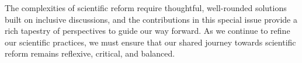 \documentclass[authordate, editorial, noabstract, issue]{jote-new-article}
\begin{document}
The complexities of scientific reform require thoughtful, well-rounded solutions built on inclusive discussions, and the contributions in this special issue provide a rich tapestry of perspectives to guide our way forward. As we continue to refine our scientific practices, we must ensure that our shared journey towards scientific reform remains reflexive, critical, and balanced.

























































































\printbibliography
\end{document}
